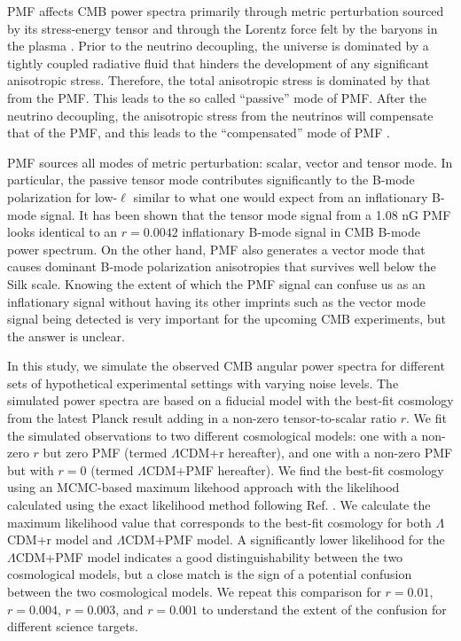 \documentclass[12pt, notitlepage, onecolumn, amsmath, amssymb, aps]{revtex4-1}
\begin{document}
PMF affects CMB power spectra primarily through metric perturbation
sourced by its stress-energy tensor and through the Lorentz force felt
by the baryons in the plasma \cite{Mack:2001gc}. Prior to the neutrino
decoupling, the universe is dominated by a tightly coupled radiative
fluid that hinders the development of any significant anisotropic
stress. Therefore, the total anisotropic stress is dominated by that
from the PMF. This leads to the so called ``passive'' mode of
PMF. After the neutrino decoupling, the anisotropic stress from the
neutrinos will compensate that of the PMF, and this leads to the
``compensated'' mode of PMF \cite{shaw10}.

PMF sources all modes of metric perturbation: scalar, vector and
tensor mode. In particular, the passive tensor mode contributes
significantly to the B-mode polarization for low-$\ell$ similar to
what one would expect from an inflationary B-mode signal. It has been
shown that the tensor mode signal from a 1.08 nG PMF looks identical
to an $r=0.0042$ inflationary B-mode signal \cite{renzi18} in CMB
B-mode power spectrum. On the other hand, PMF also generates a vector
mode that causes dominant B-mode polarization anisotropies that
survives well below the Silk scale. Knowing the extent of which the PMF
signal can confuse us as an inflationary signal without having its
other imprints such as the vector mode signal being detected is very
important for the upcoming CMB experiments, but the answer is unclear.

In this study, we simulate the observed CMB angular power spectra for
different sets of hypothetical experimental settings with varying
noise levels. The simulated power spectra are based on a fiducial
model with the best-fit cosmology from the latest Planck result
\cite{Aghanim:2018eyx} adding in a non-zero
tensor-to-scalar ratio $r$. We fit the simulated observations to two
different cosmological models: one with a non-zero $r$ but zero PMF
(termed $\Lambda$CDM+r hereafter), and one with a non-zero PMF but
with $r=0$ (termed $\Lambda$CDM+PMF hereafter). We find the best-fit
cosmology using an MCMC-based maximum likehood approach with the
likelihood calculated using the exact likelihood method following
Ref. \cite{Perotto:2006rj}. We calculate the maximum likelihood value
that corresponds to the best-fit cosmology for both $\Lambda$CDM+r
model and $\Lambda$CDM+PMF model. A significantly lower likelihood for
the $\Lambda$CDM+PMF model indicates a good distinguishability between
the two cosmological models, but a close match is the sign of a
potential confusion between the two cosmological models. We repeat
this comparison for $r=0.01$, $r=0.004$, $r=0.003$, and $r=0.001$ to
understand the extent of the confusion for different science targets.
\end{document}
